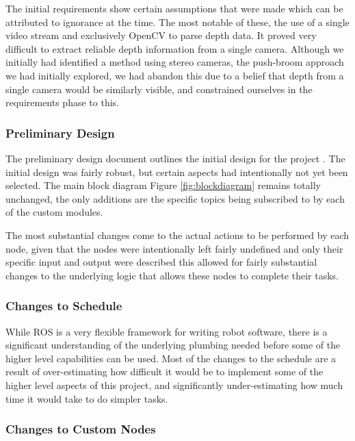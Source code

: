 \documentclass{article}[12]
\begin{document}
		The initial requirements show certain assumptions that were made which can be attributed to ignorance at the time. The most notable of these, the use of a single video stream and exclusively OpenCV to parse depth data. It proved very difficult to extract reliable depth information from a single camera. Although we initially had identified a method using stereo cameras, the push-broom approach \cite{barry2015pushbroom} we had initially explored, we had abandon this due to a belief that depth from a single camera would be similarly visible, and constrained ourselves in the requirements phase to this.

		\subsubsection{Preliminary Design }
		
		The preliminary design document outlines the initial design for the project \cite{pdd}. The initial design was fairly robust, but certain aspects had intentionally not yet been selected. The main block diagram Figure \ref{fig:blockdiagram} remains totally unchanged, the only additions are the specific topics being subscribed to by each of the custom modules. 
		
		The most substantial changes come to the actual actions to be performed by each node, given that the nodes were intentionally left fairly undefined and only their specific input and output were described this allowed for fairly substantial changes to the underlying logic that allows these nodes to complete their tasks.


		\subsubsection{Changes to Schedule}
	
	While ROS is a very flexible framework for writing robot software, there is a significant understanding of the underlying plumbing needed before some of the higher level capabilities can be used. Most of the changes to the schedule are a result of over-estimating how difficult it would be to implement some of the higher level aspects of this project, and significantly under-estimating how much time it would take to do simpler tasks.
	
		\subsubsection{Changes to Custom Nodes}
	
\end{document}
